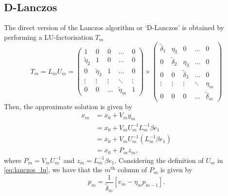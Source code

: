 \subsection{D-Lanczos} The direct version of the Lanczos algorithm or `D-Lanczos' is obtained by performing a LU-factorisation $T_m$
\begin{equation}
  T_m = L_m U_m =
  \begin{pmatrix}
    1              & 0              & 0      & \dots          & 0      \\
    \tilde{\eta}_2 & 1              & 0      & \dots          & 0      \\
    0              & \tilde{\eta}_3 & 1      & \dots          & 0      \\
    \vdots         & \vdots         & \vdots & \ddots         & \vdots \\
    0              & 0              & \dots  & \tilde{\eta}_m & 1
  \end{pmatrix}
  \times
  \begin{pmatrix}
    \tilde{\delta}_1 & \eta_2           & 0                & \dots  & 0                \\
    0                & \tilde{\delta}_2 & \eta_3           & \dots  & 0                \\
    0                & 0                & \tilde{\delta}_3 & \dots  & 0                \\
    \vdots           & \vdots           & \vdots           & \ddots & \eta_m           \\
    0                & 0                & 0                & \dots  & \tilde{\delta}_m
  \end{pmatrix}
  \label{eq:lanczos_lu}
\end{equation}
Then, the approximate solution is given by
\begin{align*}
  x_m & = x_0 + V_m y_m                           \\
      & = x_0 + V_m U_m^{-1} L_m^{-1} \beta e_1   \\
      & = x_0 + V_m U_m^{-1} (L_m^{-1} \beta e_1) \\
      & = x_0 + P_m z_m,
\end{align*}
where $P_m = V_m U_m^{-1}$ and $z_m = L_m^{-1} \beta e_1$. Considering the definition of $U_m$ in \cref{eq:lanczos_lu}, we have that the $m^{\text{th}}$ column of $P_m$ is given by
\begin{equation}
  p_m = \frac{1}{\tilde{\delta}_m}\left[v_m - \eta_m p_{m-1}\right].
  \label{eq:lanczos_p}
\end{equation}
